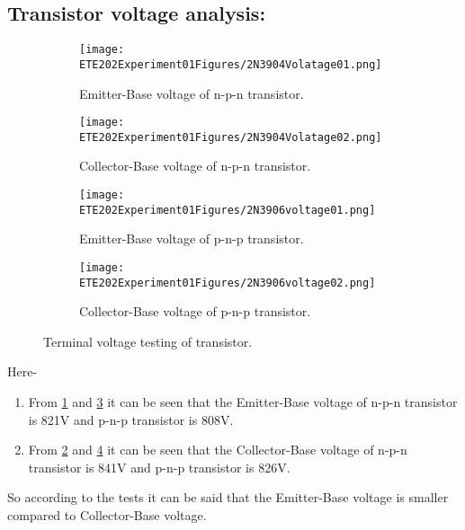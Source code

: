 \documentclass[a4paper, 14pt]{extarticle}
\begin{document}
    \newpage
    
        \subsection{Transistor voltage analysis:}
            \begin{figure}[h]
                \centering
                \begin{subfigure}[h]{0.4\textwidth} %
                    \texttt{[image: ETE202Experiment01Figures/2N3904Volatage01.png]}
                        \caption{Emitter-Base voltage of n-p-n transistor.}
                        \label{fig:subfig5}
                \end{subfigure}
                \hfill
                \begin{subfigure}[h]{0.4\textwidth} %
                \centering
                    \texttt{[image: ETE202Experiment01Figures/2N3904Volatage02.png]}
                        \caption{Collector-Base voltage of n-p-n transistor.}
                        \label{fig:subfig6}
                    \end{subfigure}
                \vspace{25pt} 
                \begin{subfigure}[h]{0.4\textwidth} %
                    \centering
                    \texttt{[image: ETE202Experiment01Figures/2N3906voltage01.png]}
                    \caption{Emitter-Base voltage of p-n-p transistor.}
                    \label{fig:subfig7}
                \end{subfigure}
                \hfill
                \begin{subfigure}[h]{0.4\textwidth} %
                    \texttt{[image: ETE202Experiment01Figures/2N3906voltage02.png]}
                    \caption{Collector-Base voltage of p-n-p transistor.}
                    \label{fig:subfig8}
                \end{subfigure}
                \vspace{5pt}
                \caption{Terminal voltage testing of transistor.}
                \label{fig:mainfig2}
            \end{figure}
            Here-
            \begin{enumerate}
                \item From \ref{fig:subfig5} and \ref{fig:subfig7} it can be seen that the Emitter-Base voltage of n-p-n transistor is 821V and p-n-p transistor is 808V.
                \item From \ref{fig:subfig6} and \ref{fig:subfig8} it can be seen that the Collector-Base voltage of n-p-n transistor is 841V and p-n-p transistor is 826V.
            \end{enumerate}
            So according to the tests it can be said that the Emitter-Base voltage is smaller compared to Collector-Base voltage.
\end{document}

